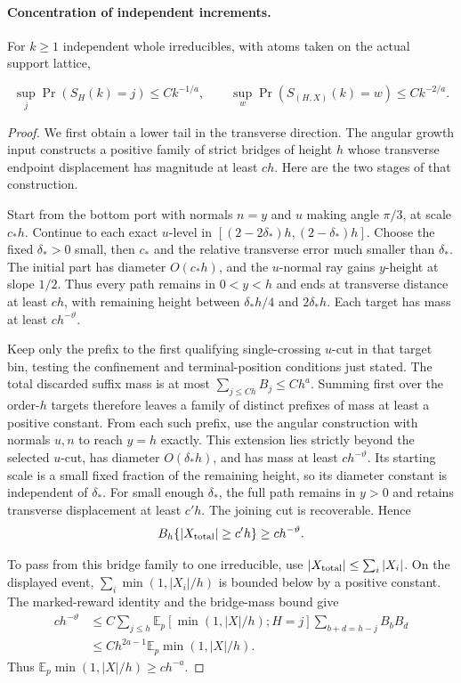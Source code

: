\paragraph{Concentration of independent increments.}
\begin{lemma}\label{R:cal:atoms}
For $k\ge1$ independent whole irreducibles, with atoms taken on the actual
support lattice,

\[
 \sup_j\Pr(S_H(k)=j)\le C k^{-1/a},\qquad
 \sup_w\Pr(S_{(H,X)}(k)=w)\le C k^{-2/a}. 
\]
\end{lemma}
\begin{proof}
We first obtain a lower tail in the transverse direction. The angular
growth input constructs a positive family of strict bridges of height $h$
whose transverse endpoint displacement has magnitude at least $ch$.
Here are the two stages of that construction.

Start from the bottom port with normals $n=y$ and $u$ making angle
$\pi/3$, at scale $c_*h$. Continue to each exact $u$-level in
$[(2-2\delta_*)h,(2-\delta_*)h]$. Choose the fixed $\delta_*>0$ small,
then $c_*$ and the relative transverse error much smaller than
$\delta_*$. The initial part has diameter $O(c_*h)$, and the
$u$-normal ray gains $y$-height at slope $1/2$. Thus every path remains
in $0<y<h$ and ends at transverse distance at least $ch$, with remaining
height between $\delta_*h/4$ and $2\delta_*h$. Each target has mass
at least $c h^{-\vartheta}$.

Keep only the prefix to the first qualifying single-crossing $u$-cut
in that target bin, testing the confinement and terminal-position
conditions just stated. The total discarded suffix mass is at most
$\sum_{j\le Ch}B_j\le Ch^a$. Summing first over the order-$h$ targets
therefore leaves a family of distinct prefixes of mass at least a
positive constant. From each such prefix, use the angular construction
with normals $u,n$ to reach $y=h$ exactly. This extension lies strictly
beyond the selected $u$-cut, has diameter $O(\delta_*h)$, and has mass
at least $c h^{-\vartheta}$. Its starting scale is a small fixed
fraction of the remaining height, so its diameter constant is independent
of $\delta_*$. For small enough $\delta_*$, the full path remains in
$y>0$ and retains transverse displacement at least $c'h$. The joining
cut is recoverable. Hence
\[
 B_h\{|X_{\rm total}|\ge c'h\}\ge c h^{-\vartheta}.
\]

To pass from this bridge family to one irreducible, use
$|X_{\rm total}|\le\sum_i|X_i|$. On the displayed event,
$\sum_i\min(1,|X_i|/h)$ is bounded below by a positive constant.
The marked-reward identity and the bridge-mass bound give
\[
\begin{aligned}
 c h^{-\vartheta}
 &\le C\sum_{j\le h}\mathbb E_p[\min(1,|X|/h);H=j]
                \sum_{b+d=h-j}B_bB_d\\
 &\le C h^{2a-1}\mathbb E_p\min(1,|X|/h).
\end{aligned}
\]
Thus $\mathbb E_p\min(1,|X|/h)\ge ch^{-a}$.


\end{proof}
